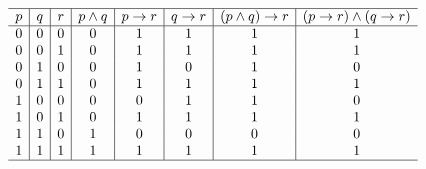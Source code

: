 {{        %
        \begin{practices}
            \begin{table}[H]
                \[
                    \begin{array}{c|c|c|c|c|c|c|c}
                        \hline
                        p & q & r & p \wedge q & p \rightarrow r & q \rightarrow r & (p \wedge q) \rightarrow r & (p \rightarrow r) \wedge (q \rightarrow r) \\
                        \hline
                        0 & 0 & 0 & 0 & 1 & 1 & 1 & 1 \\
                        0 & 0 & 1 & 0 & 1 & 1 & 1 & 1 \\
                        0 & 1 & 0 & 0 & 1 & 0 & 1 & 0 \\
                        0 & 1 & 1 & 0 & 1 & 1 & 1 & 1 \\
                        1 & 0 & 0 & 0 & 0 & 1 & 1 & 0 \\
                        1 & 0 & 1 & 0 & 1 & 1 & 1 & 1 \\
                        1 & 1 & 0 & 1 & 0 & 0 & 0 & 0 \\
                        1 & 1 & 1 & 1 & 1 & 1 & 1 & 1 \\
                        \hline
                   \end{array}
               \]
            \end{table}
        \end{practices}

}}
